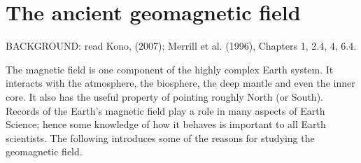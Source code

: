 \chapter{The ancient geomagnetic field}


\noindent
BACKGROUND: 
read Kono, (2007);   \nocite{kono07} 
Merrill et al. (1996), Chapters 1, 2.4, 4, 6.4. \nocite{merrill96}

\vskip 24pt



The magnetic field is one component of the highly complex Earth system.  It interacts with the atmosphere, the biosphere,  the deep mantle and even the inner core.  It also has the useful property of pointing roughly North (or South).  Records of the Earth's magnetic field play a role in many aspects of Earth Science; hence some knowledge of how it behaves is important to all Earth scientists.   The following introduces some of the reasons for studying the geomagnetic field.   


